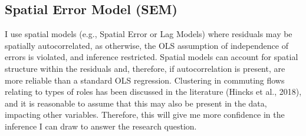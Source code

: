 \documentclass[
  number]{elsarticle}
\begin{document}
\subsection{Spatial Error Model (SEM)}\label{sec-sem}

I use spatial models (e.g., Spatial Error or Lag Models) where residuals
may be spatially autocorrelated, as otherwise, the OLS assumption of
independence of errors is violated, and inference restricted. Spatial
models can account for spatial structure within the residuals and,
therefore, if autocorrelation is present, are more reliable than a
standard OLS regression. Clustering in commuting flows relating to types
of roles has been discussed in the literature (Hincks et al., 2018), and
it is reasonable to assume that this may also be present in the data,
impacting other variables. Therefore, this will give me more confidence
in the inference I can draw to answer the research question.
\end{document}
